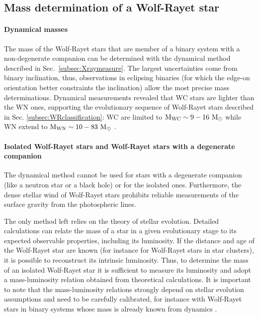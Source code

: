 \documentclass[a4paper,titlepage]{book}     	%
\newcommand{\sun}{\ensuremath{_\odot}}
\newcommand{\msun}{\ensuremath{M\sun}}
\begin{document}
\subsection{Mass determination of a Wolf-Rayet star}\label{subsec:massWR}
\paragraph{Dynamical masses} The mass of the Wolf-Rayet stars that are member of a binary system with a non-degenerate companion can be determined with the dynamical method described in Sec.\ \ref{subsec:Xraymeasure}. The largest uncertainties come from binary inclination, thus, observations in eclipsing binaries (for which the edge-on orientation better constraints the inclination) allow the most precise mass determinations. Dynamical measurements revealed that WC stars are lighter than the WN ones, supporting the evolutionary sequence of Wolf-Rayet stars described in Sec. \ref{subsec:WRclassification}: WC are limited to $\rm M_{\rm WC}\sim 9-16~\msun$ while WN extend to $\rm M_{\rm WN}\sim 10-83~\msun$ \cite{WR_signature}.

\paragraph{Isolated Wolf-Rayet stars and Wolf-Rayet stars with a degenerate companion} The dynamical method cannot be used for stars with a degenerate companion (like a neutron star or a black hole) or for the isolated ones. Furthermore, the dense stellar wind of Wolf-Rayet stars prohibits reliable measurements of the surface gravity from the photospheric lines. 

The only method left relies on the theory of stellar evolution.  Detailed calculations can relate the mass of a star in a given evolutionary stage to its expected observable properties, including its luminosity. If the distance and age of the Wolf-Rayet star are known (for instance for  Wolf-Rayet stars in star clusters), it is possible to reconstruct its intrinsic luminosity. Thus, to determine the mass of an isolated Wolf-Rayet star it is sufficient to measure its luminosity and adopt a mass-luminosity relation obtained from theoretical calculations. It is important to note that the mass-luminosity relations strongly depend on stellar evolution assumptions and need to be carefully calibrated, for instance with Wolf-Rayet stars in binary systems whose mass is already known from dynamics \cite{Nugis2000_WRwinds}.
\end{document}
